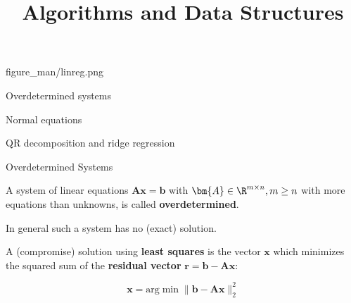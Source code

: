 \documentclass[11pt,compress,t,notes=noshow, xcolor=table]{beamer}
\title{Algorithms and Data Structures}
\begin{document}
{figure_man/linreg.png}
{
  \item Overdetermined systems
  \item Normal equations
  \item QR decomposition and ridge regression
}

\begin{vbframe}{Overdetermined Systems}

A system of linear equations $\bm{Ax} = \bm{b}$ with $\bm{A} \in \R^{m\times n}, m \ge n$ with more equations than unknowns, is called \textbf{overdetermined}.

\lz

In general such a system has no (exact) solution.

\lz

A (compromise) solution using \textbf{least squares} is the vector $\bm{x}$ which minimizes the squared sum of the \textbf{residual vector} $\bm{r} = \mathbf{b} - \mathbf{A}\boldsymbol{x}$:

$$
\bm{x} = \text{arg} \min \|\mathbf{b} - \mathbf{A}\boldsymbol{x}\|^2_2
$$

\end{vbframe}
\end{document}
